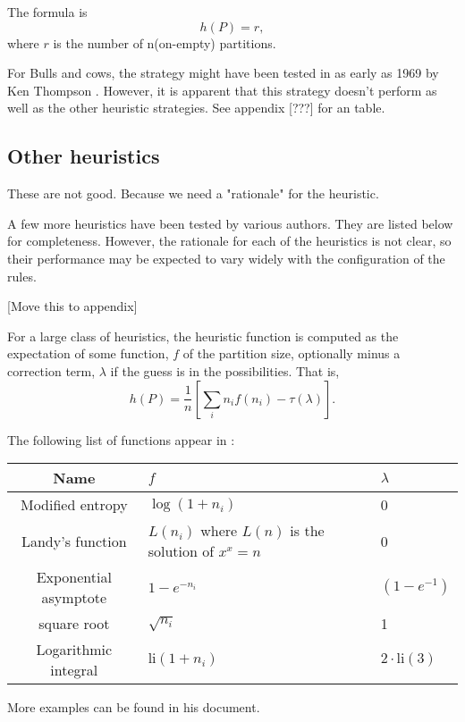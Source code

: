 The formula is
\[
h(P) = r ,
\]
where $r$ is the number of n(on-empty) partitions.


For Bulls and cows, the \maxpar{} strategy might have been tested in as early as 1969 by Ken Thompson \cite{ritchie01}. However, it is apparent that this strategy doesn't perform as well as the other heuristic strategies. See appendix [???] for an table.

\subsection{Other heuristics}




These are not good. Because we need a "rationale" for the heuristic. 

A few more heuristics have been tested by various authors. They are listed below for completeness. However, the rationale for each of the heuristics is not clear, so their performance may be expected to vary widely with the configuration of the rules.

[Move this to appendix]

For a large class of heuristics, the heuristic function is computed as the expectation of some function, $f$ of the partition size, optionally minus a correction term, $\lambda$ if the guess is in the possibilities. That is,
\[
h(P) = \frac{1}{n} \left[\sum_i n_i f(n_i) - \tau(\lambda) \right].
\]

The following list of functions appear in \cite{pepperdine10}:
\begin{center}
\begin{tabular}{c l l}
\hline
Name & $f$ & $\lambda$ \\
\hline
Modified entropy & $\log (1+n_i)$ & 0 \\
Landy's function & $L(n_i)$ where $L(n)$ is the solution of $x^x = n$ & 0 \\
Exponential asymptote & $1-e^{-n_i}$ & $(1-e^{-1})$ \\
square root & $\sqrt{n_i}$ & 1 \\
Logarithmic integral & $\text{li}(1+n_i)$ & $2 \cdot \text{li}(3)$ \\
\hline
\end{tabular}
\end{center}
More examples can be found in his document.

